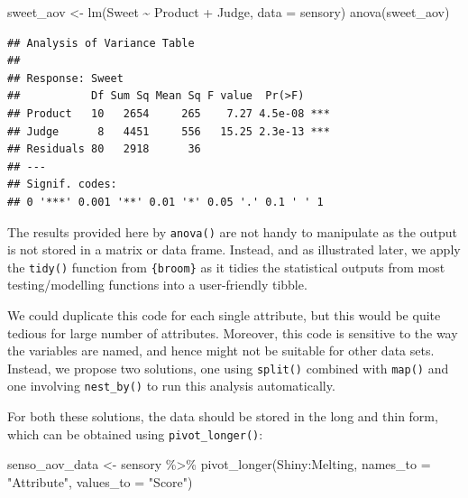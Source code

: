 \documentclass[
]{krantz}
\makeatletter
\newenvironment{Shaded}{\begin{snugshade}}{\end{snugshade}}
\newcommand{\AttributeTok}[1]{\textcolor[rgb]{0.61,0.61,0.61}{#1}}
\newcommand{\FunctionTok}[1]{\textcolor[rgb]{0,0,0}{#1}}
\newcommand{\NormalTok}[1]{#1}
\newcommand{\OtherTok}[1]{\textcolor[rgb]{0.37,0.37,0.37}{#1}}
\newcommand{\SpecialCharTok}[1]{\textcolor[rgb]{0,0,0}{#1}}
\newcommand{\StringTok}[1]{\textcolor[rgb]{0.5,0.5,0.5}{#1}}
\renewenvironment{quote}{\begin{VF}}{\end{VF}}
\newenvironment{kframe}{%
\medskip{}
\setlength{\fboxsep}{.8em}
 \def\at@end@of@kframe{}%
 \ifinner\ifhmode%
  \def\at@end@of@kframe{\end{minipage}}%
  \begin{minipage}{\columnwidth}%
 \fi\fi%
 \def\FrameCommand##1{\hskip\@totalleftmargin \hskip-\fboxsep
 \colorbox{shadecolor}{##1}\hskip-\fboxsep
     \hskip-\linewidth \hskip-\@totalleftmargin \hskip\columnwidth}%
 \MakeFramed {\advance\hsize-\width
   \@totalleftmargin\z@ \linewidth\hsize
   \@setminipage}}%
 {\par\unskip\endMakeFramed%
 \at@end@of@kframe}
\renewenvironment{Shaded}{\begin{kframe}}{\end{kframe}}
\makeatother
\begin{document}
\begin{Shaded}
\begin{Highlighting}[]
\NormalTok{sweet\_aov }\OtherTok{\textless{}{-}} \FunctionTok{lm}\NormalTok{(Sweet }\SpecialCharTok{\textasciitilde{}}\NormalTok{ Product }\SpecialCharTok{+}\NormalTok{ Judge, }\AttributeTok{data =}\NormalTok{ sensory)}
\FunctionTok{anova}\NormalTok{(sweet\_aov)}
\end{Highlighting}
\end{Shaded}

\begin{verbatim}
## Analysis of Variance Table
## 
## Response: Sweet
##           Df Sum Sq Mean Sq F value  Pr(>F)    
## Product   10   2654     265    7.27 4.5e-08 ***
## Judge      8   4451     556   15.25 2.3e-13 ***
## Residuals 80   2918      36                    
## ---
## Signif. codes:  
## 0 '***' 0.001 '**' 0.01 '*' 0.05 '.' 0.1 ' ' 1
\end{verbatim}

\begin{quote}
The results provided here by \texttt{anova()} are not handy to manipulate as the output is not stored in a matrix or data frame. Instead, and as illustrated later, we apply the \texttt{tidy()} function from \texttt{\{broom\}} as it tidies the statistical outputs from most testing/modelling functions into a user-friendly tibble.
\end{quote}

We could duplicate this code for each single attribute, but this would be quite tedious for large number of attributes. Moreover, this code is sensitive to the way the variables are named, and hence might not be suitable for other data sets. Instead, we propose two solutions, one using \texttt{split()} combined with \texttt{map()} and one involving \texttt{nest\_by()} to run this analysis automatically.

For both these solutions, the data should be stored in the long and thin form, which can be obtained using \texttt{pivot\_longer()}:

\begin{Shaded}
\begin{Highlighting}[]
\NormalTok{senso\_aov\_data }\OtherTok{\textless{}{-}}\NormalTok{ sensory }\SpecialCharTok{\%\textgreater{}\%}
  \FunctionTok{pivot\_longer}\NormalTok{(Shiny}\SpecialCharTok{:}\NormalTok{Melting, }
               \AttributeTok{names\_to =} \StringTok{"Attribute"}\NormalTok{, }\AttributeTok{values\_to =} \StringTok{"Score"}\NormalTok{)}
\end{Highlighting}
\end{Shaded}
\end{document}
